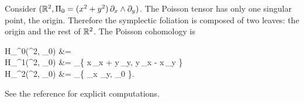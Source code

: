 \documentclass[main.tex]{subfiles}
\begin{document}
\begin{example}
	Consider $(\mathbb{R}^2, \Pi_0 = (x^2+y^2)\,\partial_x \wedge \partial_y)$. The Poisson tensor has only one singular point, the origin. Therefore the symplectic foliation is composed of two leaves: the origin and the rest of $\mathbb{R}^2$. The Poisson cohomology is
	\begin{eqalign}
		H_\Pi^0(\R^2, \Pi_0) &= \R {}\\
		H_\Pi^1(\R^2, \Pi_0) &= _\R \{ x\,\partial_x + y\,\partial_y,\; y\,\partial_x - x\,\partial_y \}\\
		H_\Pi^2(\R^2, \Pi_0) &= _\R \{ \partial_x \wedge \partial_y,\; \Pi_0 \}.
	\end{eqalign}
	See the reference for explicit computations.
\end{example}
\end{document}
